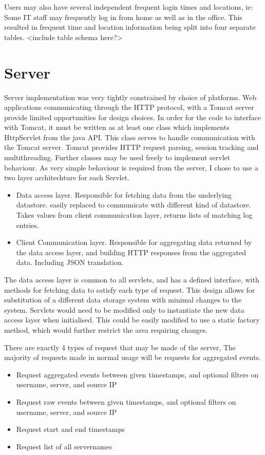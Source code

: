 Users may also have several independent frequent login times and locations, ie: Some IT staff may frequently log in from home as well as in the office. This resulted in frequent time and location information being split into four separate tables. <include table schema here?>

\section{Server}
Server implementation was very tightly constrained by choice of platforms. Web applications communicating through the HTTP protocol, with a Tomcat server provide limited opportunities for design choices.
In order for the code to interface with Tomcat, it must be written as at least one class which implements HttpServlet from the java API. 
This class serves to handle communication with the Tomcat server. Tomcat provides HTTP request parsing, session tracking and multithreading. Further classes may be used freely to implement servlet behaviour. As very simple behaviour is required from the server, I chose to use a two layer architechture for each Servlet. 
\begin{itemize}
\item{Data access layer. Responsible for fetching data from the underlying datastore. easily replaced to communicate with different kind of datastore. Takes values from client communication layer, returns lists of matching log entries.}
\item{Client Communication layer. Responsible for aggregating data returned by the data access layer, and building HTTP responses from the aggregated data. Including JSON translation.}
\end{itemize}
The data access layer is common to all servlets, and has a defined interface, with methods for fetching data to satisfy each type of request. This design allows for substitution of a different data storage system with minimal changes to the system. Servlets would need to be modified only to instantiate the new data access layer when initialised. This could be easily modified to use a static factory method, which would further restrict the area requiring changes.

There are exactly 4 types of request that may be made of the server, The majority of requests made in normal usage will be requests for aggregated events. 
\begin{itemize}
\item{Request aggregated events between given timestamps, and optional filters on username, server, and source IP}
\item{Request raw events between given timestamps, and optional filters on username, server, and source IP}
\item{Request start and end timestamps}
\item{Request list of all servernames}
\end{itemize}

